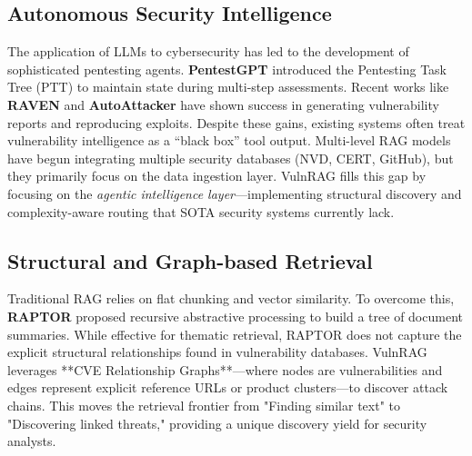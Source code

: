 \subsection{Autonomous Security Intelligence}
The application of LLMs to cybersecurity has led to the development of sophisticated pentesting agents. \textbf{PentestGPT} \cite{pentestgpt} introduced the Pentesting Task Tree (PTT) to maintain state during multi-step assessments. Recent works like \textbf{RAVEN} \cite{raven} and \textbf{AutoAttacker} \cite{autoattacker} have shown success in generating vulnerability reports and reproducing exploits. Despite these gains, existing systems often treat vulnerability intelligence as a ``black box'' tool output. Multi-level RAG models \cite{multilevelrag} have begun integrating multiple security databases (NVD, CERT, GitHub), but they primarily focus on the data ingestion layer. VulnRAG fills this gap by focusing on the \textit{agentic intelligence layer}—implementing structural discovery and complexity-aware routing that SOTA security systems currently lack.

\subsection{Structural and Graph-based Retrieval}
Traditional RAG relies on flat chunking and vector similarity. To overcome this, \textbf{RAPTOR} \cite{raptor} proposed recursive abstractive processing to build a tree of document summaries. While effective for thematic retrieval, RAPTOR does not capture the explicit structural relationships found in vulnerability databases. VulnRAG leverages **CVE Relationship Graphs**—where nodes are vulnerabilities and edges represent explicit reference URLs or product clusters—to discover attack chains. This moves the retrieval frontier from "Finding similar text" to "Discovering linked threats," providing a unique discovery yield for security analysts.
